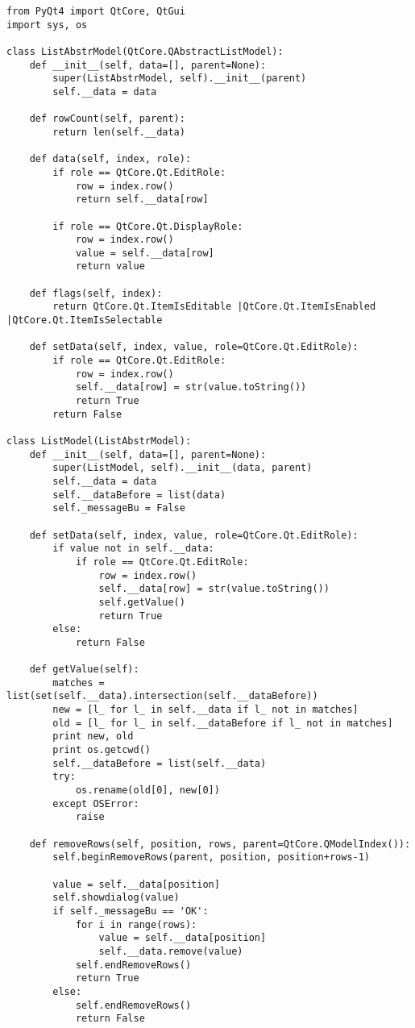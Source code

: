 \begin{verbatim}
from PyQt4 import QtCore, QtGui
import sys, os

class ListAbstrModel(QtCore.QAbstractListModel): 
    def __init__(self, data=[], parent=None):
        super(ListAbstrModel, self).__init__(parent)
        self.__data = data

    def rowCount(self, parent):
        return len(self.__data)

    def data(self, index, role):
        if role == QtCore.Qt.EditRole:
            row = index.row()
            return self.__data[row]

        if role == QtCore.Qt.DisplayRole:
            row = index.row()
            value = self.__data[row]
            return value

    def flags(self, index):
        return QtCore.Qt.ItemIsEditable |QtCore.Qt.ItemIsEnabled |QtCore.Qt.ItemIsSelectable

    def setData(self, index, value, role=QtCore.Qt.EditRole):
        if role == QtCore.Qt.EditRole:
            row = index.row()
            self.__data[row] = str(value.toString())
            return True
        return False

class ListModel(ListAbstrModel):
    def __init__(self, data=[], parent=None):
        super(ListModel, self).__init__(data, parent)
        self.__data = data
        self.__dataBefore = list(data)
        self._messageBu = False

    def setData(self, index, value, role=QtCore.Qt.EditRole):
        if value not in self.__data:
            if role == QtCore.Qt.EditRole:
                row = index.row()
                self.__data[row] = str(value.toString())
                self.getValue()
                return True
        else:
            return False

    def getValue(self):
        matches = list(set(self.__data).intersection(self.__dataBefore))
        new = [l_ for l_ in self.__data if l_ not in matches]
        old = [l_ for l_ in self.__dataBefore if l_ not in matches]
        print new, old
        print os.getcwd()
        self.__dataBefore = list(self.__data)
        try:
            os.rename(old[0], new[0])
        except OSError:
            raise

    def removeRows(self, position, rows, parent=QtCore.QModelIndex()):
        self.beginRemoveRows(parent, position, position+rows-1)

        value = self.__data[position]
        self.showdialog(value)
        if self._messageBu == 'OK':
            for i in range(rows):    
                value = self.__data[position]   
                self.__data.remove(value)
            self.endRemoveRows()
            return True
        else:
            self.endRemoveRows()
            return False
            

\end{verbatim}
